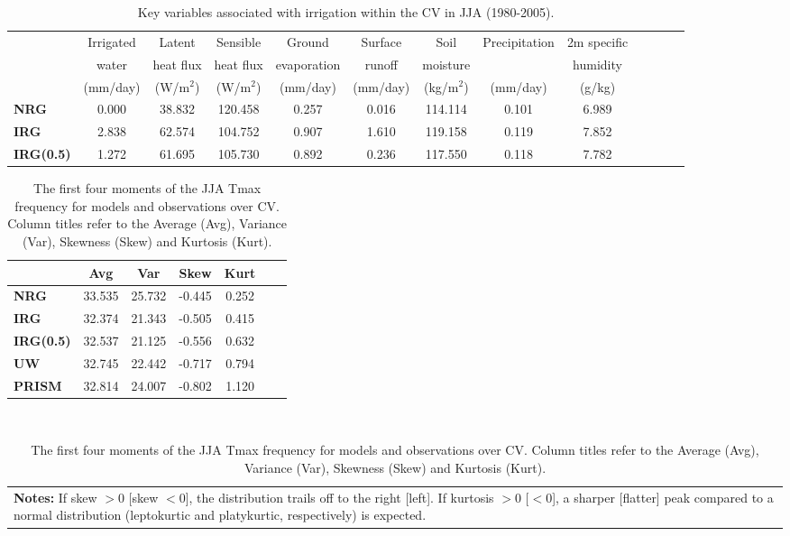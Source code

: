 \documentclass[draft,ms]{agutex}   %
\begin{document}
\begin{table}
\begin{center}
\caption{Key variables associated with irrigation within the CV in JJA (1980-2005).} \label{tab:table2}
\begin{tabular*}{7.5in}{l @{\extracolsep{\fill}}cccccccccccc}
\hline & Irrigated & Latent & Sensible & Ground & Surface & Soil & Precipitation & 2m specific \\ 
& water & heat flux & heat flux & evaporation & runoff & moisture & & humidity \\ 
& (mm/day) & (W/m$^2$) & (W/m$^2$) & (mm/day) & (mm/day) & (kg/m$^2$) & (mm/day) & (g/kg) \\ 
\hline \textbf{NRG} & 0.000 & 38.832 & 120.458 & 0.257 & 0.016 & 114.114 & 0.101 & 6.989 \\  
\textbf{IRG} & 2.838 & 62.574 & 104.752 & 0.907 & 1.610 & 119.158 & 0.119 & 7.852 \\ 
\textbf{IRG(0.5)} & 1.272 & 61.695 & 105.730 & 0.892 & 0.236 & 117.550 & 0.118 & 7.782 \\ 
\hline
\end{tabular*}
\end{center}
\end{table}

\begin{table}
\begin{center}
\caption{The first four moments of the JJA Tmax frequency for models and observations over CV. Column titles refer to the Average (Avg), Variance (Var), Skewness (Skew) and Kurtosis (Kurt).} \label{tab:table3}
\begin{tabular*}{4in}{l @{\extracolsep{\fill}}cccccc}
\hline & Avg &Var & Skew & Kurt \\
\hline \textbf{NRG} & 33.535 & 25.732 & -0.445 & 0.252 \\
\textbf{IRG} & 32.374 & 21.343 & -0.505 & 0.415 \\
\textbf{IRG(0.5)} & 32.537 & 21.125 & -0.556 & 0.632 \\
\textbf{UW} & 32.745 & 22.442 & -0.717 & 0.794 \\
\textbf{PRISM} & 32.814 & 24.007 & -0.802 & 1.120 \\
\hline
\end{tabular*} \\

\begin{tabular}{p{3in}}
\small\textbf{Notes:} If skew $>0$ [skew $<0$], the distribution trails off to the right [left]. If kurtosis $> 0$ [$<0$], a sharper [flatter] peak compared to a normal distribution (leptokurtic and platykurtic, respectively) is expected.
\end{tabular}
\end{center}
\end{table}
\end{document}
